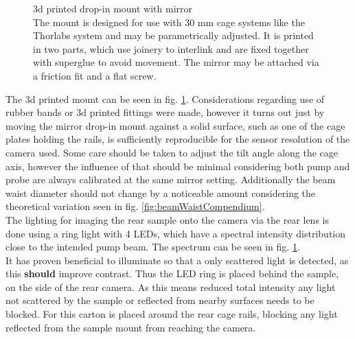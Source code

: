 \documentclass[twoside,openright]{scrreprt}
\begin{document}
\begin{figure}[hbtp]
\begin{subfigure}[t]{0.3\textwidth}
\end{subfigure}
\caption{3d printed drop-in mount with mirror\\
The mount is designed for use with 30 mm cage systems like the Thorlabs system and may be parametrically adjusted.
It is printed in two parts, which use joinery to interlink and are fixed together with superglue to avoid movement.
The mirror may be attached via a friction fit and a flat screw.\label{fig:drop-in-Mirror-mount}}
\end{figure}


The 3d printed mount can be seen in fig. \ref{fig:drop-in-Mirror-mount}.
Considerations regarding use of rubber bands or 3d printed fittings were made, however it turns out just by moving the mirror drop-in mount against a solid surface, such as one of the cage plates holding the rails, is sufficiently reproducible for the sensor resolution of the camera used. Some care should be taken to adjust the tilt angle along the cage axis, however the influence of that should be minimal considering both pump and probe are always calibrated at the same mirror setting. Additionally the beam waist diameter should not change by a noticeable amount considering the theoretical variation seen in fig. \ref{fig:beamWaistCompendium}.\\

The lighting for imaging the rear sample onto the camera via the rear lens is done using a ring light with 4 LEDs, which have a spectral intensity distribution close to the intended pump beam. The spectrum can be seen in fig. \ref{fig:drop-in-Mirror-mount}.\\
It has proven beneficial to illuminate so that a only scattered light is detected, as this \textbf{should} improve contrast. Thus the LED ring is placed behind the sample, on the side of the rear camera. As this means reduced total intensity any light not scattered by the sample or reflected from nearby surfaces needs to be blocked. For this carton is placed around the rear cage rails, blocking any light reflected from the sample mount from reaching the camera.
\end{document}
